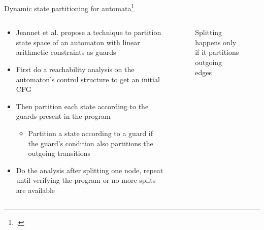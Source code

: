 \documentclass[aspectratio=169]{beamer}
\begin{document}
\begin{frame}{Dynamic state partitioning for automata\footcite{jeannet_dynamic_1999}}
  \begin{columns}
    \begin{column}{0.7\textwidth}
      \begin{itemize}[<+->]
      \item Jeannet et al. propose a technique to partition state space of an automaton with linear arithmetic constraints as guards
      \item First do a reachability analysis on the automaton's control structure to get an initial CFG
      \item Then partition each state according to the guards present in the program
        \begin{itemize}
        \item Partition a state according to a guard if the guard's condition also partitions the outgoing transitions
        \end{itemize}
      \item Do the analysis after splitting one node, repeat until verifying the program or no more splits are available
      \end{itemize}
    \end{column}

    \begin{column}{0.3\textwidth}
      \begin{figure}
        \centering
        
      
      \caption{Splitting happens only if it partitions outgoing edges}
    \end{figure}

    \end{column}
  \end{columns}
\end{frame}
\end{document}
